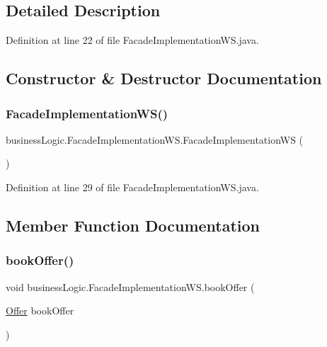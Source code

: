 \subsection{Detailed Description}


Definition at line 22 of file Facade\+Implementation\+W\+S.\+java.



\subsection{Constructor \& Destructor Documentation}
\mbox{\label{classbusinessLogic_1_1FacadeImplementationWS_a22415eec1f4d0a160f02cfdc1ac80825}} 
\subsubsection{\texorpdfstring{FacadeImplementationWS()}{FacadeImplementationWS()}}
{\footnotesize\ttfamily business\+Logic.\+Facade\+Implementation\+W\+S.\+Facade\+Implementation\+WS (\begin{DoxyParamCaption}{ }\end{DoxyParamCaption})}



Definition at line 29 of file Facade\+Implementation\+W\+S.\+java.


\begin{DoxyCode}{0}

\end{DoxyCode}


\subsection{Member Function Documentation}
\mbox{\label{classbusinessLogic_1_1FacadeImplementationWS_a0c3a269d277719643ca61e030580812a}} 
\subsubsection{\texorpdfstring{bookOffer()}{bookOffer()}}
{\footnotesize\ttfamily void business\+Logic.\+Facade\+Implementation\+W\+S.\+book\+Offer (\begin{DoxyParamCaption}\item[{\mbox{\hyperlink{classdomain_1_1Offer}{Offer}}}]{book\+Offer }\end{DoxyParamCaption})}



